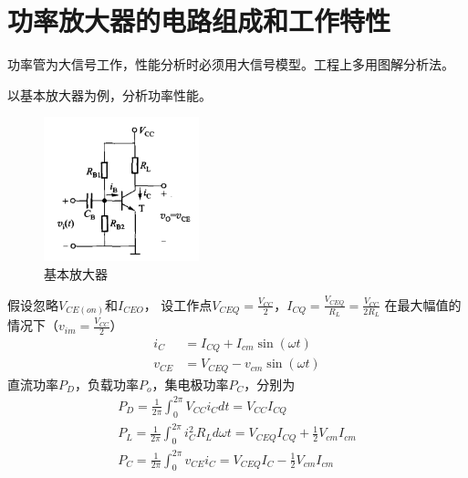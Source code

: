 \documentclass[10pt]{article}
\begin{document}
\section{功率放大器的电路组成和工作特性}
功率管为大信号工作，性能分析时必须用大信号模型。工程上多用图解分析法。
\begin{example}
    以基本放大器为例，分析功率性能。
\begin{figure}[H] %
 \centering %
 \includegraphics[width=0.4\textwidth]{pictures/2-2.png} %
 \caption{基本放大器} %
 \label{fig.2-2} %
 \end{figure}
假设忽略$V_{CE(on)}$和$I_{CEO}$，
设工作点$V_{CEQ} = \frac{V_{CC}}{2}$，$I_{CQ} = \frac{V_{CEQ}}{R_L} = \frac{V_{CC}}{2R_L}$ 
在最大幅值的情况下（$v_{im} = \frac{V_{CC}}{2}$）
\begin{align*}
    i_C &= I_{CQ} + I_{cm}\sin(\omega t) \\
    v_{CE} &= V_{CEQ} - v_{cm}\sin(\omega t)
\end{align*}
直流功率$P_D$，负载功率$P_o$，集电极功率$P_C$，分别为
\begin{align}
P_D = \frac{1}{2\pi}\int_{0}^{2\pi}V_{CC}i_{C}dt = V_{CC}I_{CQ}\\
P_L = \frac{1}{2\pi}\int_{0}^{2\pi}i_{C}^2R_L d\omega t  = V_{CEQ}I_{CQ}+\frac{1}{2}V_{cm}I_{cm}\\
P_C =  \frac{1}{2\pi}\int_{0}^{2\pi} v_{CE}i_{C} = V_{CEQ}I_{C}-\frac{1}{2}V_{cm}I_{cm}
\end{align}
\end{example}
\end{document}
